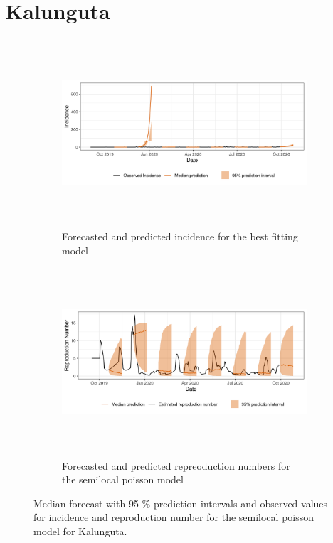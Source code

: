  \section{ Kalunguta }\begin{figure}[H]\begin{subfigure}{\textwidth}  \centering  \includegraphics[width=0.9\linewidth, height=7cm]{../output/Kalunguta_predictions.png}  \caption{Forecasted and predicted incidence for the best fitting model}\end{subfigure}

\begin{subfigure}{\textwidth}  \centering  \includegraphics[width=0.9\linewidth, height=7cm]{../output/Kalunguta_Rs.png}  \caption{Forecasted and predicted repreoduction numbers for the semilocal poisson model}\end{subfigure}  \caption{Median forecast with 95 \% prediction intervals and observed values for incidence and reproduction number for the semilocal poisson model for Kalunguta.}\end{figure}


